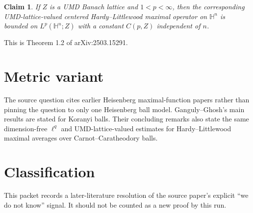 \documentclass[11pt]{article}
\newtheorem*{claim}{Claim}
\begin{document}
\begin{claim}
If \(Z\) is a UMD Banach lattice and \(1<p<\infty\), then the corresponding
UMD-lattice-valued centered Hardy--Littlewood maximal operator on
\(\mathbb H^n\) is bounded on \(L^p(\mathbb H^n;Z)\) with a constant
\(C(p,Z)\) independent of \(n\).
\end{claim}

This is Theorem 1.2 of arXiv:2503.15291.

\section*{Metric variant}

The source question cites earlier Heisenberg maximal-function papers rather
than pinning the question to only one Heisenberg ball model. Ganguly--Ghosh's
main results are stated for Koranyi balls. Their concluding remarks also state
the same dimension-free \(\ell^q\) and UMD-lattice-valued estimates for
Hardy--Littlewood maximal averages over Carnot--Caratheodory balls.

\section*{Classification}

This packet records a later-literature resolution of the source paper's
explicit ``we do not know'' signal. It should not be counted as a new proof by
this run.
\end{document}
